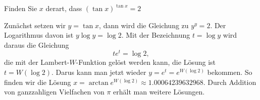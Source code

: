 Finden Sie $x$ derart, dass $(\tan x)^{\tan x}=2$

\begin{loesung}
Zunächst setzen wir $y=\tan x$, dann wird die Gleichung zu $y^y = 2$.
Der Logarithmus davon ist $y\log y = \log 2$.
Mit der Bezeichnung $t=\log y$ wird daraus die Gleichung
\[
te^t = \log 2,
\]
die mit der Lambert-$W$-Funktion gelöst werden kann, die Lösung ist
$t=W(\log 2)$.
Darus kann man jetzt wieder $y=e^t=e^{W(\log 2)}$ bekommen.
So finden wir die Lösung
$x = \arctan e^{W(\log 2)}\approx 1.00064239632968$.
Durch Addition von ganzzahligen Vielfachen von $\pi$ erhält man
weitere Lösungen.
\end{loesung}
